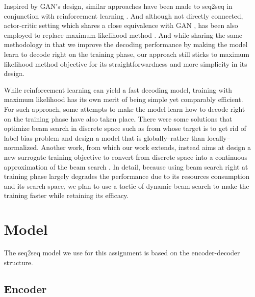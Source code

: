 \documentclass[11pt,a4paper]{article}
\begin{document}
Inspired by GAN's design, similar approaches have been made to seq2seq in conjunction with reinforcement learning \cite{kusner2016gans, yu2017seqgan,gu2017neural, gumbel2017}. And although not directly connected, actor-critic setting which shares a close equivalence with GAN \cite{pfau2016connecting}, has been also employed to replace maximum-likelihood method \cite{bahdanau2017actor}. And while sharing the same methodology in that we improve the decoding performance by making the model learn to decode right on the training phase, our approach still sticks to maximum likelihood method objective for its straightforwardness and more simplicity in its design.  

While reinforcement learning can yield a fast decoding model, training with maximum likelihood has its own merit of being simple yet comparably efficient. For such approach, some attempts to make the model learn how to decode right on the training phase have also taken place. There were some solutions that optimize beam search in discrete space such as from \citet{wiseman2016sequence, andor2016globally} whose target is to get rid of label bias problem and design a model that is globally--rather than locally--normalized. Another work, from which our work extends, instead aims at design a new surrogate training objective to convert from discrete space into a continuous approximation of the beam search \cite{goyal2018continuous}. In detail, because using beam search right at training phase largely degrades the performance due to its resources consumption and its search space, we plan to use a tactic of dynamic beam search \cite{buckman2016transition} to make the training faster while retaining its efficacy. 


\section{Model} \label{ssec:model}

The seq2seq model we use for this assignment is based on the encoder-decoder structure.



\subsection{Encoder}
\end{document}
